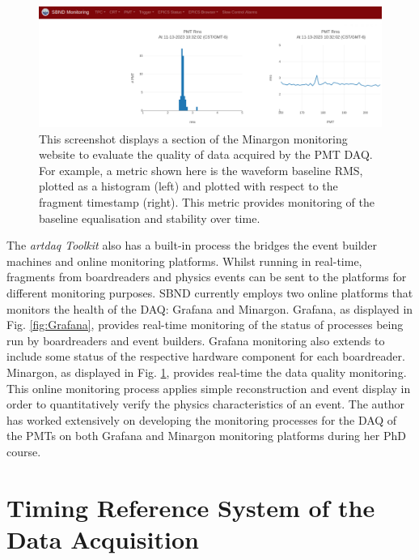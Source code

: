 \begin{figure}[htbp!] 
\centering    
\includegraphics[width=1.0\textwidth]{Minargon}
\caption[Minargon]{
This screenshot displays a section of the Minargon monitoring website to evaluate the quality of data acquired by the PMT DAQ.
For example, a metric shown here is the waveform baseline RMS, plotted as a histogram (left) and plotted with respect to the fragment timestamp (right).
This metric provides monitoring of the baseline equalisation and stability over time.
}
\label{fig:Minargon}
\end{figure}

The \textit{artdaq Toolkit} also has a built-in process the bridges the event builder machines and online monitoring platforms.
Whilst running in real-time, fragments from boardreaders and physics events can be sent to the platforms for different monitoring purposes.
SBND currently employs two online platforms that monitors the health of the DAQ: Grafana and Minargon.
Grafana, as displayed in Fig. \ref{fig:Grafana}, provides real-time monitoring of the status of processes being run by boardreaders and event builders. 
Grafana monitoring also extends to include some status of the respective hardware component for each boardreader.
Minargon, as displayed in Fig. \ref{fig:Minargon}, provides real-time the data quality monitoring. 
This online monitoring process applies simple reconstruction and event display in order to quantitatively verify the physics characteristics of an event. 
The author has worked extensively on developing the monitoring processes for the DAQ of the PMTs on both Grafana and Minargon monitoring platforms during her PhD course. 

\section{Timing Reference System of the Data Acquisition}
\label{section5.2}

